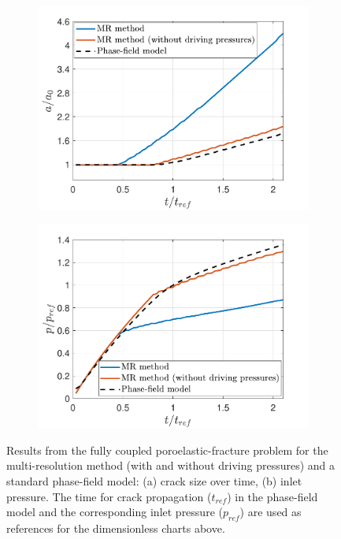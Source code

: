 \begin{figure}
\centering
\vspace{-\abovedisplayskip}
\begin{subfigure}{.5\textwidth}
  \centering
  \includegraphics[width=\linewidth]{img/comparison_prob/poroelastic_length_2}
  \caption{}
  \label{fig:results_size_miehe}
\end{subfigure}%
\begin{subfigure}{.5\textwidth}
  \centering
  \includegraphics[width=\linewidth]{img/comparison_prob/poroelastic_pressure_2}
  \caption{}
  \label{fig:results_pressure_miehe}
\end{subfigure}
  \caption{Results from the fully coupled poroelastic-fracture problem for the multi-resolution method (with and without driving pressures) and a standard phase-field model: (a) crack size over time, (b) inlet pressure.  The time for crack propagation ($t_{ref}$) in the phase-field model and the corresponding inlet pressure ($p_{ref}$) are used as references for the dimensionless charts above.}
  \label{fig:results_charts_miehe}
\end{figure}


